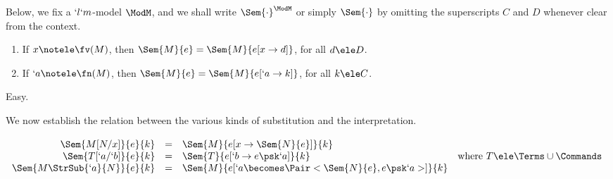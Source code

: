 \documentclass{CSML}
\begin{document}
Below, we fix a $`l`m$-model $\ModM$, and we shall write $\Sem{ \cdot}^{\ModM}$ or simply $\Sem{ \cdot}$ by
omitting the superscripts $C$ and $D$ whenever clear from the context.

 \begin{lem} \label{lem:beta-weak} \label{lem:eta-sem}\hfill
 \begin{enumerate}
 \item \label{lem:eta-sem i}
If $x \notele \fv(M)$, then $\Sem{ M }{ e } = \Sem{ M }{ e[x \to d] } $, for all $d \ele D$.

 \item \label{lem:eta-sem ii}
If $`a \notele \fn(M)$, then $\Sem{ M }{ e } = \Sem{ M }{ e[`a \to k] } $, for all $k \ele C$.

 \end{enumerate}
 \end{lem}

 \begin{Proof} Easy. %
 \end{Proof}


We now establish the relation between the various kinds of substitution and the interpretation.

 \begin{lem} \label{lem:sem_substitution_renaming}
 $ \begin{array}[t]{rcll}
 \Sem{ M[N/x] }{ e }{ k } &=& \Sem{ M }{ e[x \to \Sem{ N }{ e }] }{ k } \\
 \Sem{ T[`a/`b] }{ e }{ k } &=& \Sem{ T }{ e[`b \to e\psk`a] }{ k } & \textrm{where }T\ele \Terms \cup \Commands \\
 \Sem{ M \StrSub{`a}{N} }{ e }{ k } &=& \Sem{ M }{ e[`a \becomes \Pair< \Sem{ N }{ e } , e\psk`a > ] }{ k }
 \end{array} $

 \end{lem}
\end{document}
